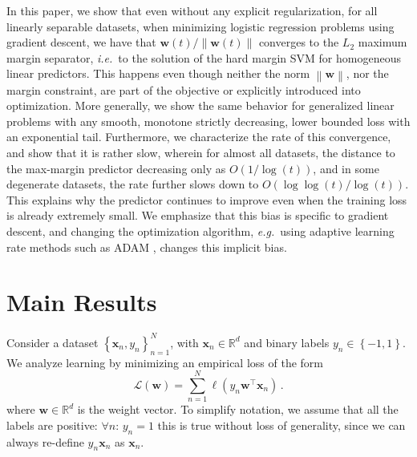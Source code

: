 \documentclass[twoside,11pt,english]{article}
\newcommand{\norm}[1]{\left\lVert{#1}\right\rVert}
\begin{document}
In this paper, we show that even without any explicit regularization,
for all linearly separable datasets, when minimizing logistic regression problems using gradient descent, we have that $\mathbf{w}(t)/\norm{\mathbf{w}(t)}$ converges to the
$L_{2}$ maximum margin separator, \emph{i.e.}~to the solution of
the hard margin SVM for homogeneous linear predictors. This happens even though neither the norm $\left\lVert \mathbf{w}\right\rVert $,
nor the margin constraint, are part of the objective or
explicitly introduced into optimization. More generally, we show the
same behavior for generalized linear problems with any smooth, monotone
strictly decreasing, lower bounded loss with an exponential tail.
Furthermore, we characterize the rate of this convergence, and show
that it is rather slow, wherein for almost all datasets, the distance to the max-margin predictor
decreasing only as ${O}(1/\log(t))$, and in some degenerate datasets, the rate further slows down to ${O}(\log\log(t)/\log(t))$. This explains why the predictor
continues to improve even when the training loss is already extremely
small. We emphasize that this bias is specific to
gradient descent, and changing the optimization algorithm, \emph{e.g.}~using
adaptive learning rate methods such as ADAM \citep{Kingma2015}, changes
this implicit bias.

\section{Main Results}


Consider a dataset $\left\{ \mathbf{x}_{n},y_{n}\right\} _{n=1}^{N}$,
with $\mathbf{x}_n\in\mathbb{R}^d$ and binary labels $y_{n}\in\left\{ -1,1\right\} $. We analyze learning
by minimizing an empirical loss of the form 
\begin{equation}
\mathcal{L}\left(\mathbf{w}\right)=\sum_{n=1}^{N}\ell\left(y_{n}\mathbf{w}^{\top}\mathbf{x}_{n}\right)\,.\label{eq: general loss functions}
\end{equation}
where $\mathbf{w}\in\mathbb{R}^{d}$ is the weight vector. To simplify notation, we assume that all the labels are positive:
$\forall n:\,y_{n}=1$ \textemdash{} this is true without loss of
generality, since we can always re-define $y_{n}\mathbf{x}_{n}$ as
$\mathbf{x}_{n}$.
\end{document}
